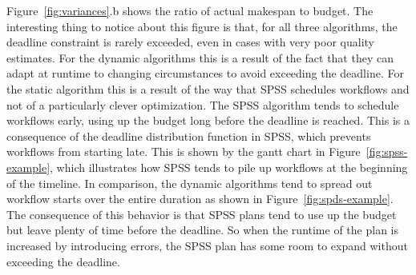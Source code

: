 \documentclass[conference]{IEEEtran}
\begin{document}
Figure~\ref{fig:variances}.b shows the ratio of actual makespan to budget. The interesting thing to notice about this figure is that, for all three algorithms, the deadline constraint is rarely exceeded, even in cases with very poor quality estimates. For the dynamic algorithms this is a result of the fact that they can adapt at runtime to changing circumstances to avoid exceeding the deadline. For the static algorithm this is a result of the way that SPSS schedules workflows and not of a particularly clever optimization. The SPSS algorithm tends to schedule workflows early, using up the budget long before the deadline is reached. This is a consequence of the deadline distribution function in SPSS, which prevents workflows from starting late. This is shown by the gantt chart in Figure~\ref{fig:spss-example}, which illustrates how SPSS tends to pile up workflows at the beginning of the timeline. In comparison, the dynamic algorithms tend to spread out workflow starts over the entire duration as shown in Figure~\ref{fig:spds-example}. The consequence of this behavior is that SPSS plans tend to use up the budget but leave plenty of time before the deadline. So when the runtime of the plan is increased by introducing errors, the SPSS plan has some room to expand without exceeding the deadline.

\end{document}
